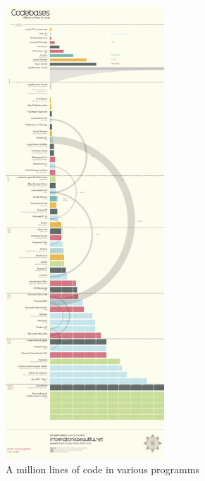 \documentclass[a4paper,12pt]{scrreprt}
\begin{document}
\begin{figure}
	\begin{center}
	\includegraphics[width=0.53\textwidth]{images/LoC}
	\end{center}
		
	\caption[Million lines of Code]{A million lines of code in various programms}
	\label{fig:Lines}
\end{figure}



%

\end{document}
